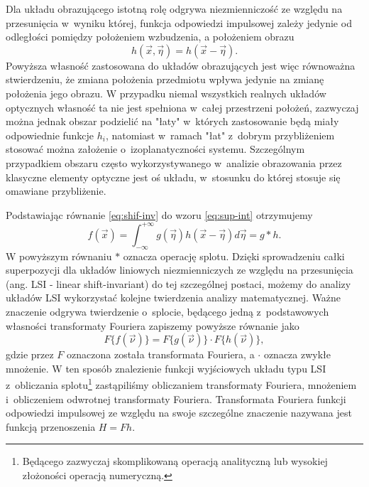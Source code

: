 Dla układu obrazującego istotną rolę odgrywa niezmienniczość ze względu na przesunięcia w~wyniku której, funkcja odpowiedzi impulsowej zależy jedynie od odległości pomiędzy położeniem wzbudzenia, a położeniem obrazu
\begin{equation}
h(\vec{x},\vec{\eta})=h(\vec{x}-\vec{\eta}).
\label{eq:shif-inv}
\end{equation}
Powyższa własność zastosowana do układów obrazujących jest więc równoważna stwierdzeniu, że zmiana położenia przedmiotu wpływa jedynie na zmianę położenia jego obrazu. W przypadku niemal wszystkich realnych układów optycznych własność ta nie jest spełniona w~całej przestrzeni położeń, zazwyczaj można jednak obszar podzielić na "łaty" w~których zastosowanie będą miały odpowiednie funkcje $h_i$, natomiast w~ramach "łat" z~dobrym przybliżeniem stosować można założenie o~izoplanatyczności systemu. Szczególnym przypadkiem obszaru często wykorzystywanego w~analizie obrazowania przez klasyczne elementy optyczne jest oś układu, w~stosunku do której stosuje się omawiane przybliżenie.

Podstawiając równanie \ref{eq:shif-inv} do wzoru \ref{eq:sup-int} otrzymujemy
\begin{equation}
f(\vec{x})=\int_{-\infty}^{+\infty} g(\vec{\eta})  h(\vec{x}-\vec{\eta}) d \vec{\eta} = g \ast h.
\label{eq:splot}
\end{equation}
W powyższym równaniu $\ast$ oznacza operację splotu. Dzięki sprowadzeniu całki superpozycji dla układów liniowych niezmienniczych ze względu na przesunięcia (ang. LSI - linear shift-invariant) do tej szczególnej postaci, możemy do analizy układów LSI wykorzystać kolejne twierdzenia analizy matematycznej. Ważne znaczenie odgrywa twierdzenie o~splocie, będącego jedną z~podstawowych własności transformaty Fouriera zapiszemy powyższe równanie jako
\begin{equation}
F\{f(\vec{\nu})\} = F\{g(\vec{\nu})\} \cdot F\{h(\vec{\nu})\},
\label{eq:transfer-mult}
\end{equation}
gdzie przez $F$ oznaczona została transformata Fouriera, a $\cdot$ oznacza zwykłe mnożenie. W ten sposób znalezienie funkcji wyjściowych układu typu LSI z~obliczania splotu\footnote{Będącego zazwyczaj skomplikowaną operacją analityczną lub wysokiej złożoności operacją numeryczną.} zastąpiliśmy obliczaniem transformaty Fouriera, mnożeniem i~obliczeniem odwrotnej transformaty Fouriera. Transformata Fouriera funkcji odpowiedzi impulsowej ze względu na swoje szczególne znaczenie nazywana jest funkcją przenoszenia $H=F{h}$.

